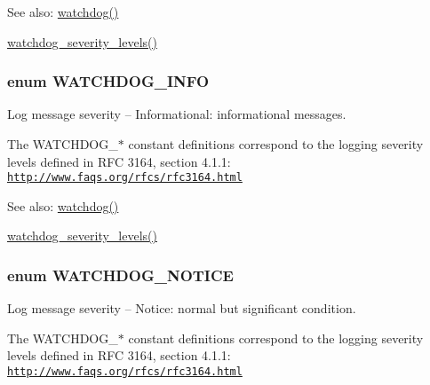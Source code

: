 \begin{Desc}
\item[See also:]\hyperlink{bootstrap_8inc_cb7338e6740302727043d64e3ae1257b}{watchdog()} 

\hyperlink{common_8inc_fb5d4b58ec7e483153644c0f664e0ca4}{watchdog\_\-severity\_\-levels()} \end{Desc}
\hypertarget{bootstrap_8inc_9629ff808fd20ce4abb297db5976af4d}{
\subsubsection[{WATCHDOG\_\-INFO}]{\setlength{\rightskip}{0pt plus 5cm}enum {\bf WATCHDOG\_\-INFO}}}
\label{bootstrap_8inc_9629ff808fd20ce4abb297db5976af4d}


Log message severity -- Informational: informational messages.

The WATCHDOG\_\-$\ast$ constant definitions correspond to the logging severity levels defined in RFC 3164, section 4.1.1: \href{http://www.faqs.org/rfcs/rfc3164.html}{\tt http://www.faqs.org/rfcs/rfc3164.html}

\begin{Desc}
\item[See also:]\hyperlink{bootstrap_8inc_cb7338e6740302727043d64e3ae1257b}{watchdog()} 

\hyperlink{common_8inc_fb5d4b58ec7e483153644c0f664e0ca4}{watchdog\_\-severity\_\-levels()} \end{Desc}
\hypertarget{bootstrap_8inc_757a33416683e8c44636a8799f60b477}{
\subsubsection[{WATCHDOG\_\-NOTICE}]{\setlength{\rightskip}{0pt plus 5cm}enum {\bf WATCHDOG\_\-NOTICE}}}
\label{bootstrap_8inc_757a33416683e8c44636a8799f60b477}


Log message severity -- Notice: normal but significant condition.

The WATCHDOG\_\-$\ast$ constant definitions correspond to the logging severity levels defined in RFC 3164, section 4.1.1: \href{http://www.faqs.org/rfcs/rfc3164.html}{\tt http://www.faqs.org/rfcs/rfc3164.html}

